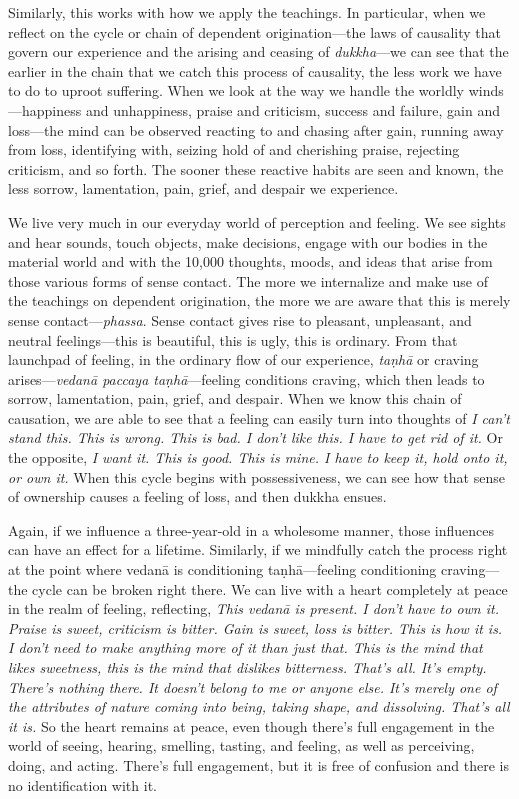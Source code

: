 Similarly, this works with how we apply the teachings. In particular, 
when we reflect on the cycle or chain of dependent origination---the 
laws of causality that govern our experience and the arising and 
ceasing of \emph{dukkha}---we can see that the earlier in the chain 
that we catch this process of causality, the less work we have to do to 
uproot suffering. When we look at the way we handle the worldly 
winds---happiness and unhappiness, praise and criticism, success and 
failure, gain and loss---the mind can be observed reacting to and 
chasing after gain, running away from loss, identifying with, seizing 
hold of and cherishing praise, rejecting criticism, and so forth. The 
sooner these reactive habits are seen and known, the less sorrow, 
lamentation, pain, grief, and despair we experience.

We live very much in our everyday world of perception and feeling. We 
see sights and hear sounds, touch objects, make decisions, engage with 
our bodies in the material world and with the 10,000 thoughts, moods, 
and ideas that arise from those various forms of sense contact. The 
more we internalize and make use of the teachings on dependent 
origination, the more we are aware that this is merely sense 
contact---\emph{phassa}. Sense contact gives rise to pleasant, 
unpleasant, and neutral feelings---this is beautiful, this is ugly, 
this is ordinary. From that launchpad of feeling, in the ordinary flow 
of our experience, \emph{taṇhā} or craving arises---\emph{vedanā 
paccaya taṇhā}---feeling conditions craving, which then leads to 
sorrow, lamentation, pain, grief, and despair. When we know this chain 
of causation, we are able to see that a feeling can easily turn into 
thoughts of \emph{I can't stand this. This is wrong. This is bad. I 
don't like this. I have to get rid of it.} Or the opposite, \emph{I 
want it. This is good. This is mine. I have to keep it, hold onto it, 
or own it.} When this cycle begins with possessiveness, we can see how 
that sense of ownership causes a feeling of loss, and then dukkha 
ensues.

Again, if we influence a three-year-old in a wholesome manner, those 
influences can have an effect for a lifetime. Similarly, if we 
mindfully catch the process right at the point where vedanā is 
conditioning taṇhā---feeling conditioning craving---the cycle can be 
broken right there. We can live with a heart completely at peace in the 
realm of feeling, reflecting, \emph{This vedanā is present. I don't 
have to own it. Praise is sweet, criticism is bitter. Gain is sweet, 
loss is bitter. This is how it is. I don't need to make anything more 
of it than just that. This is the mind that likes sweetness, this is 
the mind that dislikes bitterness. That's all. It's empty. There's 
nothing there. It doesn't belong to me or anyone else. It's merely one 
of the attributes of nature coming into being, taking shape, and 
dissolving. That's all it is.} So the heart remains at peace, even 
though there's full engagement in the world of seeing, hearing, 
smelling, tasting, and feeling, as well as perceiving, doing, and 
acting. There's full engagement, but it is free of confusion and there 
is no identification with it.

